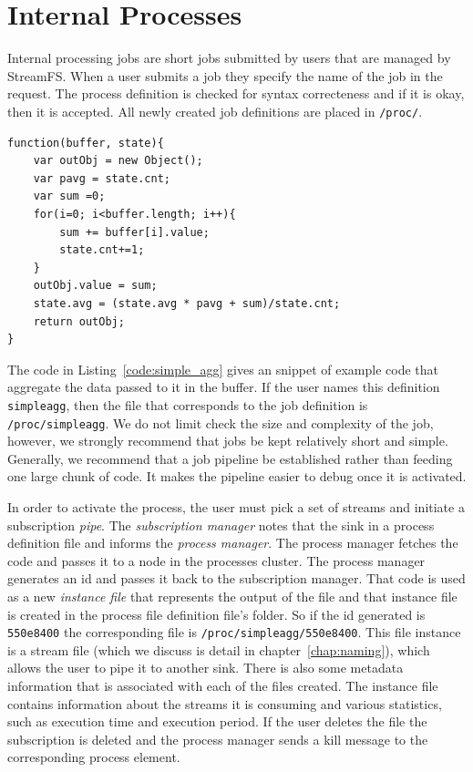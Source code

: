 \section{Internal Processes}
\label{sec:internalprocs}

Internal processing jobs are short jobs submitted by users that are managed by StreamFS.  When a user submits
a job they specify the name of the job in the request.  The process definition is checked for syntax correcteness
and if it is okay, then it is accepted.  All newly created job definitions are placed in \texttt{/proc/}.


\begin{lstlisting}[caption={Simple aggregator process job.},label={code:simple_agg}]
function(buffer, state){ 
    var outObj = new Object();
    var pavg = state.cnt;
    var sum =0;
    for(i=0; i<buffer.length; i++){
        sum += buffer[i].value;
        state.cnt+=1;
    }
    outObj.value = sum;
    state.avg = (state.avg * pavg + sum)/state.cnt;
    return outObj;
}
\end{lstlisting}


The code in Listing~\ref{code:simple_agg} gives an snippet of example code that aggregate the data 
passed to it in the buffer.  If the user names this definition \texttt{simpleagg}, then the file that corresponds to 
the job definition is \texttt{/proc/simpleagg}.  We do not limit check the size and complexity of the job, however, we
strongly recommend that jobs be kept relatively short and simple.  Generally, we recommend that a job pipeline 
be established rather than feeding one large chunk of code.  It makes the pipeline easier to debug once it is
activated.

In order to activate the process, the user must pick a set of streams and initiate a subscription \emph{pipe}.  The 
\emph{subscription manager} notes that the sink in a process definition file and informs the \emph{process manager}.
The process manager fetches the code and passes it to a node in the processes cluster.  The process manager
generates an id and passes it back to the subscription manager.  That code is used as a new \emph{instance file} that 
represents the output of the file and that instance file is created in the process file definition file's folder.
So if the id generated is \texttt{550e8400} the corresponding file is \texttt{/proc/simpleagg/550e8400}.
This file instance is a stream file (which we discuss is detail in chapter~\ref{chap:naming}), which allows the user
to pipe it to another sink.  There is also some metadata information that is associated with each of the files created.
The instance file contains information about the streams it is consuming and various statistics, such as 
execution time and execution period.  If the user deletes the file the subscription is deleted and the process manager sends
a kill message to the corresponding process element.

